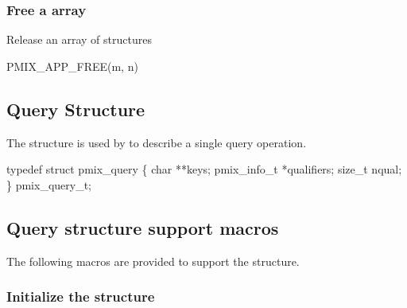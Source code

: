 \begin{arglist}
\end{arglist}


\subsubsection{Free a array}

Release an array of  structures

\cspecificstart
\begin{codepar}
PMIX_APP_FREE(m, n)
\end{codepar}
\cspecificend

\begin{arglist}
\end{arglist}

\subsection{Query Structure}

The  structure is used by  to describe a single query operation.

\cspecificstart
\begin{codepar}
typedef struct pmix_query \{
    char **keys;
    pmix_info_t *qualifiers;
    size_t nqual;
\} pmix_query_t;
\end{codepar}
\cspecificend

\subsection{Query structure support macros}
The following macros are provided to support the  structure.

\subsubsection{Initialize the  structure}

